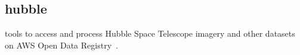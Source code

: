 \subsection{hubble}
\label{hubble}

tools to access and process Hubble Space Telescope imagery and other datasets on AWS Open Data Registry~.